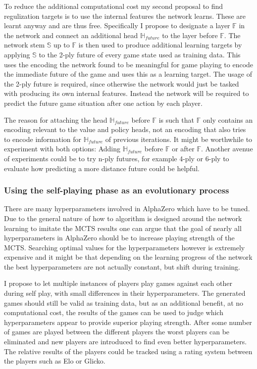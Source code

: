 \documentclass[12pt,onecolumn,oneside,titlepage]{article}
\begin{document}
To reduce the additional computational cost my second proposal to find regulization targets is to use the internal features the network learns. These are learnt anyway and are thus free.
Specifically I propose to designate a layer $\mathbb{F}$ in the network and connect an additional head $\mathbb{H}_{future}$ to the layer before $\mathbb{F}$. 
The network stem $\mathbb{S}$ up to $\mathbb{F}$ is then used to produce additional learning targets by applying $\mathbb{S}$ to the 2-ply future of every game state used as training data.
This uses the encoding the network found to be meaningful for game playing to encode the immediate future of the game and uses this as a learning target. The usage of the 2-ply future is required, since otherwise the network would just be tasked with producing
its own internal features. Instead the network will be required to predict the future game situation after one action by each player.

The reason for attaching the head $\mathbb{H}_{future}$ before $\mathbb{F}$ is such that $\mathbb{F}$ only contains an encoding relevant to the value and policy heads, not an encoding that also tries to encode information for $\mathbb{H}_{future}$ of previous iterations.
It might be worthwhile to experiment with both options: Adding $\mathbb{H}_{future}$ before $\mathbb{F}$ or after $\mathbb{F}$.
Another avenue of experiments could be to try n-ply futures, for example 4-ply or 6-ply to evaluate how predicting a more distance future could be helpful.

\subsubsection{Using the self-playing phase as an evolutionary process}

There are many hyperparameters involved in AlphaZero which have to be tuned. Due to the general nature of how to algorithm is designed around the network learning to imitate the MCTS results one can argue that the goal of
nearly all hyperparameters in AlphaZero should be to increase playing strength of the MCTS. Searching optimal values for the hyperparameters however is extremely expensive and it might be that depending on the learning progress of the network 
the best hyperparameters are not actually constant, but shift during training.

I propose to let multiple instances of players play games against each other during self play, with small differences in their hyperparameters. The generated games should still be valid as training data, but as an additional benefit, at no computational cost,
the results of the games can be used to judge which hyperparameters appear to provide superior playing strength. After some number of games are played between the different players the worst players can be eliminated and new players are introduced to find even better hyperparameters.
The relative results of the players could be tracked using a rating system between the players such as Elo or Glicko.
\end{document}
